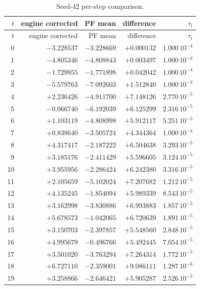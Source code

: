 \documentclass[11pt]{article}
\begin{document}
\begin{longtable}{rrrrr}
\caption{Seed-42 per-step comparison.}\label{tab:perstep}\\
\toprule
$t$ & engine corrected & PF mean & difference & $\tau_t$\\
\midrule
\endfirsthead
\toprule
$t$ & engine corrected & PF mean & difference & $\tau_t$\\
\midrule
\endhead
0  & $-3.228537$ & $-3.228669$ & $+0.000132$ & $1.000\,10^{-4}$\\
1  & $-4.805346$ & $-4.808843$ & $+0.003497$ & $1.000\,10^{-4}$\\
2  & $-1.729855$ & $-1.771898$ & $+0.042042$ & $1.000\,10^{-4}$\\
3  & $-5.579763$ & $-7.092603$ & $+1.512840$ & $1.000\,10^{-4}$\\
4  & $+2.236426$ & $-4.911700$ & $+7.148126$ & $2.770\,10^{-5}$\\
5  & $-0.066740$ & $-6.192039$ & $+6.125299$ & $2.316\,10^{-5}$\\
6  & $+1.103119$ & $-4.808998$ & $+5.912117$ & $5.251\,10^{-5}$\\
7  & $+0.838640$ & $-3.505724$ & $+4.344364$ & $1.000\,10^{-4}$\\
8  & $+4.317417$ & $-2.187222$ & $+6.504638$ & $3.293\,10^{-5}$\\
9  & $+3.185176$ & $-2.411429$ & $+5.596605$ & $3.124\,10^{-5}$\\
10 & $+3.955956$ & $-2.286424$ & $+6.242380$ & $3.316\,10^{-5}$\\
11 & $+2.105659$ & $-5.102024$ & $+7.207682$ & $1.212\,10^{-5}$\\
12 & $+4.135245$ & $-1.854094$ & $+5.989339$ & $8.543\,10^{-5}$\\
13 & $+3.162998$ & $-3.830886$ & $+6.993883$ & $1.857\,10^{-5}$\\
14 & $+5.678573$ & $-1.042065$ & $+6.720639$ & $1.891\,10^{-5}$\\
15 & $+3.150703$ & $-2.397857$ & $+5.548560$ & $2.848\,10^{-5}$\\
16 & $+4.995679$ & $-0.496766$ & $+5.492445$ & $7.054\,10^{-5}$\\
17 & $+3.501020$ & $-3.763294$ & $+7.264314$ & $1.772\,10^{-5}$\\
18 & $+6.727110$ & $-2.359001$ & $+9.086111$ & $1.287\,10^{-6}$\\
19 & $+3.258866$ & $-2.646421$ & $+5.905287$ & $2.526\,10^{-5}$\\
\bottomrule
\end{longtable}
\end{document}
